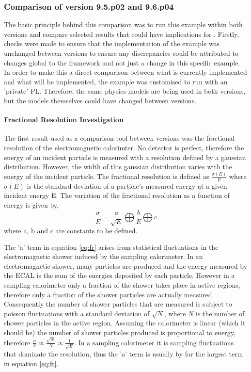 \subsubsection{Comparison of \geant version 9.5.p02 and 9.6.p04}
The basic principle behind this comparison was to run this example within both \geant versions and compare selected results that could have implications for \lhcb.  Firstly, checks were made to ensure that the implementation of the example was unchanged between versions to ensure any discrepancies could be attributed to changes global to the \geant framework and not just a change in this specific example.  In order to make this a direct comparison between what is currently implemented and what will be implemented, the example was customised to run with an \lhcb 'private' PL.  Therefore, the same physics models are being used in both versions, but the models themselves could have changed between versions.

\paragraph{Fractional Resolution Investigation}
\label{sec:FractionalResolutionInvestigation}

The first result used as a comparison tool between \geant versions was the fractional resolution of the electromagnetic calorimter.  No detector is perfect, therefore the energy of an incident particle is measured with a resolution defined by a gaussian distribution.  However, the width of this gaussian distribution varies with the energy of the incident particle.  The fractional resolution is defined as $\frac{\sigma(E)}{E}$ where $\sigma(E)$ is the standard deviation of a particle's measured energy at a given incident energy E.  The variation of the fractional resolution as a function of energy is given by, 
\begin{equation}\label{eq:fr}
\frac{\sigma}{E}=\frac{a}{\sqrt{E}} \bigoplus \frac{b}{E} \bigoplus c
\end{equation}
where a, b and c are constants to be defined\cite{wigmans2000calorimetry}.  

The 'a' term in equation \ref{eq:fr} arises from statistical fluctuations in the electromagnetic shower induced by the sampling calorimeter.  In an electromagnetic shower, many particles are produced and the energy measured by the ECAL is the sum of the energies deposited by each particle.  However in a sampling calorimeter only a fraction of the shower takes place in active regions, therefore only a fraction of the shower particles are actually measured.  Consequently the number of shower particles that are measured is subject to poisson fluctuations with a standard deviation of $\sqrt{N}$, where $N$ is the number of shower particles in the active region.  Assuming the calorimeter is linear (which it should be) the number of shower particles produced is proportional to energy, therefore $\frac{\sigma}{E} \propto \frac{\sqrt{N}}{N} \propto \frac{1}{\sqrt{E}}$. In a sampling calorimeter it is sampling fluctuations that dominate the resolution, thus the 'a' term is usually by far the largest term in equation \ref{eq:fr}.  


